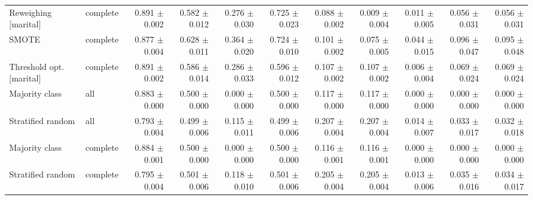 \begin{table}[t]
{\begin{tabular}{llrrrrrrrrr}
Reweighing {[}marital{]} & complete & 0.891 $\pm$ 0.002 & 0.582 $\pm$ 0.012 & 0.276 $\pm$ 0.030 & 0.725 $\pm$ 0.023 & 0.088 $\pm$ 0.002 & 0.009 $\pm$ 0.004 & 0.011 $\pm$ 0.005 & 0.056 $\pm$ 0.031 & 0.056 $\pm$ 0.031 \\
SMOTE & complete & 0.877 $\pm$ 0.004 & 0.628 $\pm$ 0.011 & 0.364 $\pm$ 0.020 & 0.724 $\pm$ 0.010 & 0.101 $\pm$ 0.002 & 0.075 $\pm$ 0.005 & 0.044 $\pm$ 0.015 & 0.096 $\pm$ 0.047 & 0.095 $\pm$ 0.048 \\
Threshold opt. {[}marital{]} & complete & 0.891 $\pm$ 0.002 & 0.586 $\pm$ 0.014 & 0.286 $\pm$ 0.033 & 0.596 $\pm$ 0.012 & 0.107 $\pm$ 0.002 & 0.107 $\pm$ 0.002 & 0.006 $\pm$ 0.004 & 0.069 $\pm$ 0.024 & 0.069 $\pm$ 0.024 \\
Majority class & all & 0.883 $\pm$ 0.000 & 0.500 $\pm$ 0.000 & 0.000 $\pm$ 0.000 & 0.500 $\pm$ 0.000 & 0.117 $\pm$ 0.000 & 0.117 $\pm$ 0.000 & 0.000 $\pm$ 0.000 & 0.000 $\pm$ 0.000 & 0.000 $\pm$ 0.000 \\
Stratified random & all & 0.793 $\pm$ 0.004 & 0.499 $\pm$ 0.006 & 0.115 $\pm$ 0.011 & 0.499 $\pm$ 0.006 & 0.207 $\pm$ 0.004 & 0.207 $\pm$ 0.004 & 0.014 $\pm$ 0.007 & 0.033 $\pm$ 0.017 & 0.032 $\pm$ 0.018 \\
Majority class & complete & 0.884 $\pm$ 0.001 & 0.500 $\pm$ 0.000 & 0.000 $\pm$ 0.000 & 0.500 $\pm$ 0.000 & 0.116 $\pm$ 0.001 & 0.116 $\pm$ 0.001 & 0.000 $\pm$ 0.000 & 0.000 $\pm$ 0.000 & 0.000 $\pm$ 0.000 \\
Stratified random & complete & 0.795 $\pm$ 0.004 & 0.501 $\pm$ 0.006 & 0.118 $\pm$ 0.010 & 0.501 $\pm$ 0.006 & 0.205 $\pm$ 0.004 & 0.205 $\pm$ 0.004 & 0.013 $\pm$ 0.006 & 0.035 $\pm$ 0.016 & 0.034 $\pm$ 0.017 \\
\bottomrule
\end{tabular}}
\end{table}
